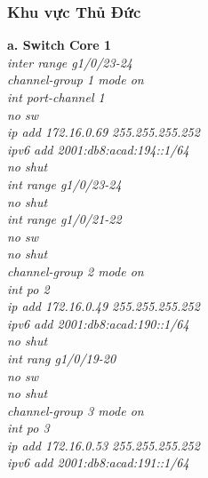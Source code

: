 \documentclass[a4paper, 12pt]{article}
\begin{document}
\subsubsection{Khu vực Thủ Đức}
\hspace*{1cm}\textbf{a. Switch Core 1}\\
\hspace*{2cm}\textit{inter range g1/0/23-24\\
\hspace*{2cm}channel-group 1 mode on\\
\hspace*{2cm}int port-channel 1\\
\hspace*{2cm}no sw\\
\hspace*{2cm}ip add 172.16.0.69 255.255.255.252\\
\hspace*{2cm}ipv6 add 2001:db8:acad:194::1/64\\
\hspace*{2cm}no shut\\
\hspace*{2cm}int range g1/0/23-24\\
\hspace*{2cm}no shut\\
\hspace*{2cm}int range g1/0/21-22\\
\hspace*{2cm}no sw\\
\hspace*{2cm}no shut\\
\hspace*{2cm}channel-group 2 mode on\\
\hspace*{2cm}int po 2\\
\hspace*{2cm}ip add 172.16.0.49 255.255.255.252\\
\hspace*{2cm}ipv6 add 2001:db8:acad:190::1/64\\
\hspace*{2cm}no shut\\
\hspace*{2cm}int rang g1/0/19-20\\
\hspace*{2cm}no sw\\
\hspace*{2cm}no shut\\
\hspace*{2cm}channel-group 3 mode on\\
\hspace*{2cm}int po 3\\
\hspace*{2cm}ip add 172.16.0.53 255.255.255.252\\
\hspace*{2cm}ipv6 add 2001:db8:acad:191::1/64\\}
\end{document}
